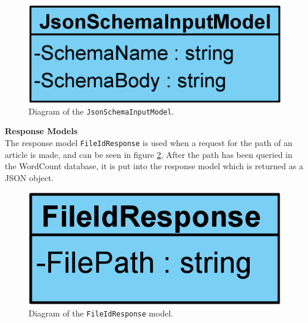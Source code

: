 \begin{figure}[H]
    \centering
    \includegraphics[scale=0.25]{Images/JsonSchemaInputModel.png}
    \caption{Diagram of the \texttt{JsonSchemaInputModel}.}
    \label{JsonSchemaInputModel}
\end{figure}

\textbf{Response Models}\\
The response model \texttt{FileIdResponse} is used when a request for the path of an article is made, and can be seen in figure \ref*{FileIdResponse},
After the path has been queried in the WordCount database, it is put into the response model which is returned as a JSON object.

\begin{figure}[H]
    \centering
    \includegraphics[scale=0.25]{Images/FileIdResponse.png}
    \caption{Diagram of the \texttt{FileIdResponse} model.}
    \label{FileIdResponse}
\end{figure}

